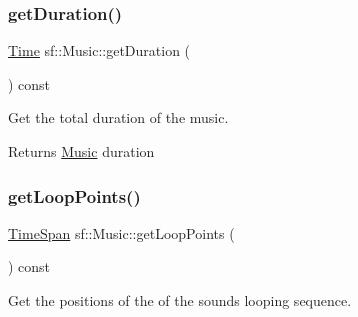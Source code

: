 \subsubsection{\texorpdfstring{getDuration()}{getDuration()}}
{\footnotesize\ttfamily \mbox{\hyperlink{classsf_1_1_time}{Time}} sf\+::\+Music\+::get\+Duration (\begin{DoxyParamCaption}{ }\end{DoxyParamCaption}) const}



Get the total duration of the music. 

\begin{DoxyReturn}{Returns}
\mbox{\hyperlink{classsf_1_1_music}{Music}} duration \begin{DoxyVerb}\end{DoxyVerb}
 
\end{DoxyReturn}
\mbox{\label{classsf_1_1_music_aae3451cad5c16ee6a6e124e62ed61361}} 
\subsubsection{\texorpdfstring{getLoopPoints()}{getLoopPoints()}}
{\footnotesize\ttfamily \mbox{\hyperlink{structsf_1_1_music_1_1_span}{Time\+Span}} sf\+::\+Music\+::get\+Loop\+Points (\begin{DoxyParamCaption}{ }\end{DoxyParamCaption}) const}



Get the positions of the of the sound\textquotesingle{}s looping sequence. 

